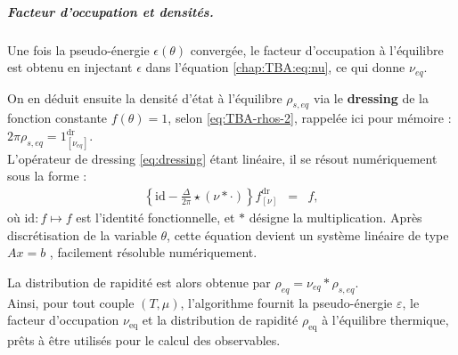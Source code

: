 \medskip
\subparagraph{Facteur d’occupation et densités.}  
Une fois la pseudo-énergie \( \epsilon(\theta) \) convergée, le facteur d’occupation  à l'équilibre est obtenu en injectant $\epsilon$ dans l’équation \eqref{chap:TBA:eq:nu}, ce qui donne  $\nu_{\!eq}$.
 
On en déduit ensuite la densité d'état à l'équilibre $\rho_{s,eq}$ via le {\bf dressing}  de la fonction constante $f(\theta) = 1$, selon \eqref{eq:TBA-rhos-2}, rappelée ici pour mémoire : $ 2\pi \rho_{s,eq}  =  1^{\mathrm{dr}}_{[\nu_{\! eq}]}$.\\

L’opérateur de dressing \eqref{eq:dressing} étant linéaire, il se résout numériquement sous la forme :
\begin{eqnarray*}
	\left\{ \mathrm{id} - \frac{\Delta}{2\pi} \star ( \nu \ast \cdot ) \right\} f^{\mathrm{dr}}_{[\nu]} & = & f,\label{eq:TBA:rho_s:num}
\end{eqnarray*}
où $\mathrm{id} \colon f \mapsto f$ est l’identité fonctionnelle, et $\ast$ désigne la multiplication.
Après discrétisation de la variable $\theta$, cette équation devient un système linéaire de type $Ax=b$ , facilement résoluble numériquement.

La distribution de rapidité est alors obtenue par $\rho_{\!eq} = \nu_{\!eq} \ast \rho_{\! s,eq}$.\\

\medskip
Ainsi, pour tout couple \((T,\mu)\), l’algorithme fournit la pseudo-énergie \( \varepsilon \), le facteur d’occupation \( \nu_{\mathrm{eq}} \) et la distribution de rapidité \( \rho_{\mathrm{eq}} \) à l’équilibre thermique, prêts à être utilisés pour le calcul des observables.





